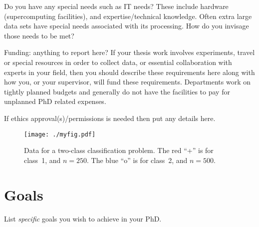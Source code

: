 \documentclass[12pt,a4paper]{article}
\begin{document}
Do you have any special needs such as IT needs?
These include hardware (supercomputing facilities),
and expertise/technical knowledge.
Often extra large data sets have special needs associated
with its processing.
How do you invisage those needs to be met?



Funding: anything to report here?
If your thesis work involves experiments, travel or special
resources in order to collect data, or essential collaboration with
experts in your field, then you should describe these requirements
here along with how you, or your supervisor, will fund these
requirements. Departments work on tightly planned budgets and
generally do not have the facilities to pay for unplanned PhD
related expenses.



If ethics approval(s)/permissions is needed then put
any details here.





\begin{figure}[tt]
\begin{center}
\texttt{[image: ./myfig.pdf]}
\caption{
Data for a two-class classification problem.
The red ``+'' is for class~1, and $n = 250$.
The blue ``o'' is for class~2, and $n = 500$.
}
\label{fig:myfig}
\end{center}
\end{figure}









\section{Goals}

List \textit{specific} goals you wish to achieve in your PhD.
\end{document}
